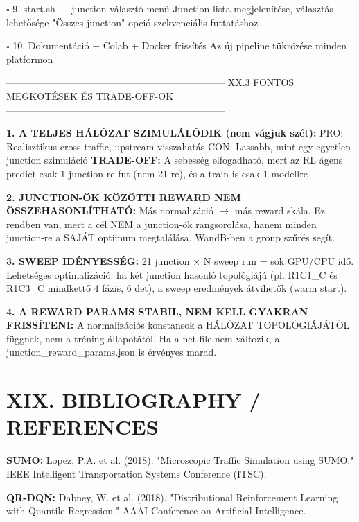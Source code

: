 \documentclass[11pt,a4paper]{article}
\begin{document}
\par\noindent\hspace*{1em}$\square$ 9. start.sh — junction választó menü
Junction lista megjelenítése, választás lehetősége
"Összes junction" opció szekvenciális futtatáshoz

\par\noindent\hspace*{1em}$\square$ 10. Dokumentáció + Colab + Docker frissítés
Az új pipeline tükrözése minden platformon

--------------------------------------------------------------------
XX.3 FONTOS MEGKÖTÉSEK ÉS TRADE-OFF-OK
--------------------------------------------------------------------

\textbf{1. A TELJES HÁLÓZAT SZIMULÁLÓDIK (nem vágjuk szét):}
PRO: Realisztikus cross-traffic, upstream visszahatás
CON: Lassabb, mint egy egyetlen junction szimuláció
\textbf{TRADE-OFF:} A sebesség elfogadható, mert az RL ágens predict
csak 1 junction-re fut (nem 21-re), és a train is csak 1 modellre

\textbf{2. JUNCTION-ÖK KÖZÖTTI REWARD NEM ÖSSZEHASONLÍTHATÓ:}
Más normalizáció $\rightarrow$ más reward skála. Ez rendben van, mert
a cél NEM a junction-ök rangsorolása, hanem minden junction-re
a SAJÁT optimum megtalálása. WandB-ben a group szűrés segít.

\textbf{3. SWEEP IDÉNYESSÉG:}
21 junction × N sweep run = sok GPU/CPU idő. Lehetséges
optimalizáció: ha két junction hasonló topológiájú (pl.
R1C1\_C és R1C3\_C mindkettő 4 fázis, 6 det), a sweep
eredmények átvihetők (warm start).

\textbf{4. A REWARD PARAMS STABIL, NEM KELL GYAKRAN FRISSÍTENI:}
A normalizációs konstansok a HÁLÓZAT TOPOLÓGIÁJÁTÓL függnek,
nem a tréning állapotától. Ha a net file nem változik, a
junction\_reward\_params.json is érvényes marad.


\section*{XIX. BIBLIOGRAPHY / REFERENCES}

\textbf{SUMO:}
Lopez, P.A. et al. (2018). "Microscopic Traffic Simulation using SUMO."
IEEE Intelligent Transportation Systems Conference (ITSC).

\textbf{QR-DQN:}
Dabney, W. et al. (2018). "Distributional Reinforcement Learning with
Quantile Regression." AAAI Conference on Artificial Intelligence.
\end{document}
